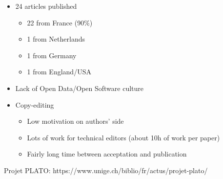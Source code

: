\documentclass[10pt,compress,serif,aspectratio=169]{beamer}
\begin{document}
\begin{frame}[t]
 \vskip0.6cm
 \begin{itemize}
  \item 24 articles published
   \begin{itemize}
   \item 22 from France (90\%)
   \item 1 from Netherlands
   \item 1 from Germany
   \item 1 from England/USA
   \end{itemize}
  \item Lack of Open Data/Open Software culture
  \item Copy-editing
 \begin{itemize}
  \item Low motivation on authors' side
  \item Lots of work for technical editors (about 10h of work per paper)
  \item Fairly long time between acceptation and publication 
 \end{itemize}
 \end{itemize}
\end{frame}


\begin{frame}[t]

  Projet PLATO: https://www.unige.ch/biblio/fr/actus/projet-plato/
\end{frame}



\end{document}
